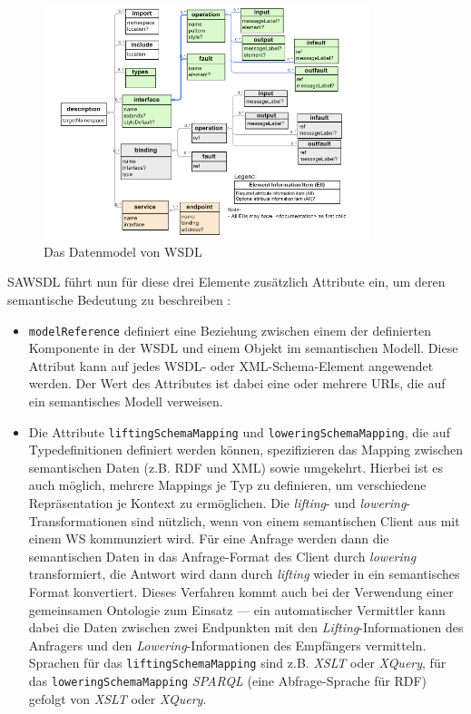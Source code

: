 \begin{figure}[ht]
\centering
\parbox{0.85\textwidth}{
    \includegraphics[width=0.85\textwidth]{media/WSDL20InfosetModel.png}
    \caption{Das Datenmodel von \ac{WSDL}}
    \label{f:wsdlmodel}
}
\end{figure}

\ac{SAWSDL} führt nun für diese drei Elemente zusätzlich Attribute ein, um deren semantische Bedeutung zu beschreiben \cite[S.62ff]{ky-sawsdl}:

\begin{itemize}
\item \texttt{modelReference} definiert eine Beziehung zwischen einem der definierten Komponente in der \ac{WSDL} und einem Objekt im semantischen Modell. Diese Attribut kann auf jedes \ac{WSDL}- oder XML-Schema-Element angewendet werden. Der Wert des Attributes ist dabei eine oder mehrere URIs, die auf ein semantisches Modell verweisen.
\item Die Attribute \texttt{liftingSchemaMapping} und \texttt{loweringSchemaMapping}, die auf Typedefinitionen definiert werden können, spezifizieren das Mapping zwischen semantischen Daten (z.B. \ac{RDF} und XML) sowie umgekehrt. Hierbei ist es auch möglich, mehrere Mappings je Typ zu definieren, um verschiedene Repräsentation je Kontext zu ermöglichen. Die \emph{lifting}- und \emph{lowering}-Transformationen sind nützlich, wenn von einem semantischen Client aus mit einem \acl{WS} kommunziert wird. Für eine Anfrage werden dann die semantischen Daten in das Anfrage-Format des Client durch \emph{lowering} transformiert, die Antwort wird dann durch \emph{lifting} wieder in ein semantisches Format konvertiert. Dieses Verfahren kommt auch bei der Verwendung einer gemeinsamen Ontologie zum Einsatz --- ein automatischer Vermittler kann dabei die Daten zwischen zwei Endpunkten mit den \emph{Lifting}-Informationen des Anfragers und den \emph{Lowering}-Informationen des Empfängers vermitteln. Sprachen für das \texttt{liftingSchemaMapping} sind z.B. \emph{XSLT} oder \emph{XQuery}, für das \texttt{loweringSchemaMapping} \emph{SPARQL} (eine Abfrage-Sprache für \ac{RDF}) gefolgt von \emph{XSLT} oder \emph{XQuery}.
\end{itemize}

